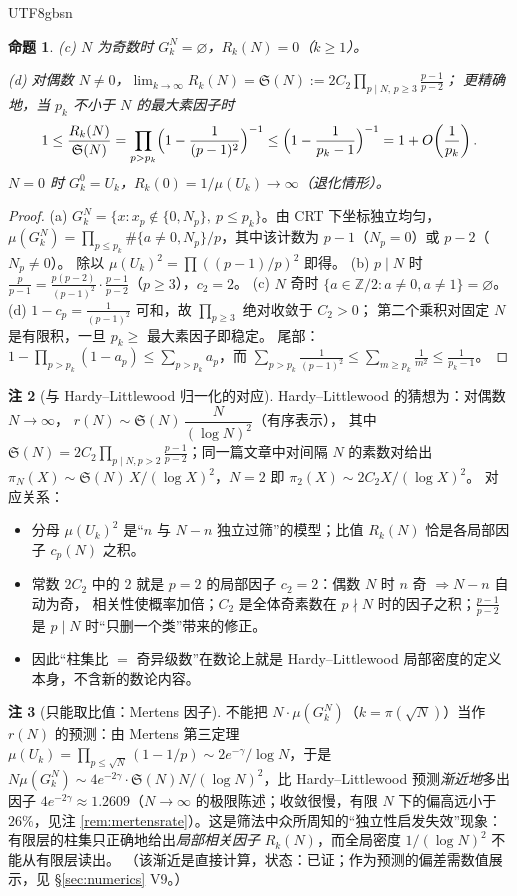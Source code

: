 \documentclass[11pt,a4paper]{article}
\newcommand{\Haar}{\mu}
\newcommand{\Sing}{\mathfrak S}
\newcommand{\status}[1]{\par\noindent\fbox{\textbf{状态：#1}}\par\smallskip}
\theoremstyle{plain}
\newtheorem{prop}{命题}[section]
\theoremstyle{definition}
\newtheorem{rem}[prop]{注}
\begin{document}
\begin{CJK}{UTF8}{gbsn}
\begin{prop}
(c) $N$ 为奇数时 $G_k^N=\varnothing$，$R_k(N)=0$（$k\ge1$）。

(d) 对偶数 $N\ne0$，$\lim_{k\to\infty}R_k(N)=\Sing(N):=2C_2\prod_{p\mid N,\,p\ge3}\frac{p-1}{p-2}$；
更精确地，当 $p_k$ 不小于 $N$ 的最大素因子时
\[
1\le\frac{R_k(N)}{\Sing(N)}=\prod_{p>p_k}\Bigl(1-\frac1{(p-1)^2}\Bigr)^{-1}
\le\Bigl(1-\frac1{p_k-1}\Bigr)^{-1}=1+O\!\left(\frac1{p_k}\right).
\]
$N=0$ 时 $G_k^0=U_k$，$R_k(0)=1/\Haar(U_k)\to\infty$（退化情形）。
\end{prop}
\status{已证}
\begin{proof}
(a) $G_k^N=\{x: x_p\notin\{0,N_p\},\ p\le p_k\}$。由 CRT 下坐标独立均匀，
$\Haar(G_k^N)=\prod_{p\le p_k}\#\{a\ne0,N_p\}/p$，其中该计数为 $p-1$（$N_p=0$）或 $p-2$（$N_p\ne0$）。
除以 $\Haar(U_k)^2=\prod((p-1)/p)^2$ 即得。
(b) $p\mid N$ 时 $\frac{p}{p-1}=\frac{p(p-2)}{(p-1)^2}\cdot\frac{p-1}{p-2}$（$p\ge3$），$c_2=2$。
(c) $N$ 奇时 $\{a\in\mathbb Z/2: a\ne0,a\ne1\}=\varnothing$。
(d) $1-c_p=\frac1{(p-1)^2}$ 可和，故 $\prod_{p\ge3}$ 绝对收敛于 $C_2>0$；
第二个乘积对固定 $N$ 是有限积，一旦 $p_k\ge$ 最大素因子即稳定。
尾部：$1-\prod_{p>p_k}(1-a_p)\le\sum_{p>p_k}a_p$，而
$\sum_{p>p_k}\frac1{(p-1)^2}\le\sum_{m\ge p_k}\frac1{m^2}\le\frac1{p_k-1}$。
\end{proof}

\begin{rem}[与 Hardy--Littlewood 归一化的对应]\label{rem:HL}
Hardy--Littlewood \cite{HL23} 的猜想为：对偶数 $N\to\infty$，
$r(N)\sim\Sing(N)\,\dfrac{N}{(\log N)^2}$（有序表示），
其中 $\Sing(N)=2C_2\prod_{p\mid N,p>2}\frac{p-1}{p-2}$；同一篇文章中对间隔 $N$ 的素数对给出
$\pi_N(X)\sim\Sing(N)\,X/(\log X)^2$，$N=2$ 即 $\pi_2(X)\sim 2C_2X/(\log X)^2$。
对应关系：
\begin{itemize}[leftmargin=*]
\item 分母 $\Haar(U_k)^2$ 是“$n$ 与 $N-n$ 独立过筛”的模型；比值 $R_k(N)$ 恰是各局部因子 $c_p(N)$ 之积。
\item 常数 $2C_2$ 中的 $2$ 就是 $p=2$ 的局部因子 $c_2=2$：偶数 $N$ 时 $n$ 奇 $\Rightarrow N-n$ 自动为奇，
相关性使概率加倍；$C_2$ 是全体奇素数在 $p\nmid N$ 时的因子之积；$\frac{p-1}{p-2}$ 是 $p\mid N$ 时“只删一个类”带来的修正。
\item 因此“柱集比 $=$ 奇异级数”在数论上就是 Hardy--Littlewood 局部密度的定义本身，不含新的数论内容。
\end{itemize}
\end{rem}

\begin{rem}[只能取比值：Mertens 因子]\label{rem:mertens}
不能把 $N\cdot\Haar(G_k^N)$（$k=\pi(\sqrt N)$）当作 $r(N)$ 的预测：由 Mertens 第三定理
$\Haar(U_k)=\prod_{p\le\sqrt N}(1-1/p)\sim 2e^{-\gamma}/\log N$，于是
$N\Haar(G_k^N)\sim 4e^{-2\gamma}\cdot\Sing(N)N/(\log N)^2$，比 Hardy--Littlewood 预测\emph{渐近地}多出因子
$4e^{-2\gamma}\approx1.2609$（$N\to\infty$ 的极限陈述；收敛很慢，有限 $N$ 下的偏高远小于 $26\%$，见注 \ref{rem:mertensrate}）。这是筛法中众所周知的“独立性启发失效”现象：
有限层的柱集只正确地给出\emph{局部相关因子} $R_k(N)$，而全局密度 $1/(\log N)^2$ 不能从有限层读出。
（该渐近是直接计算，状态：已证；作为预测的偏差需数值展示，见 \S\ref{sec:numerics} V9。）
\end{rem}


\end{CJK}
\end{document}
